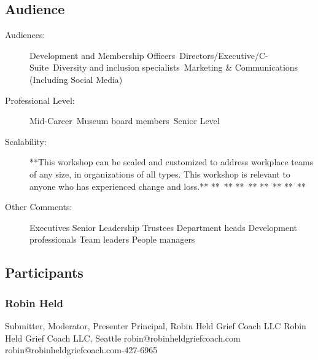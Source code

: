 \documentclass{report}
\begin{document}
              \subsection*{Audience}
                \begin{description}
                  \item [Audiences:]Development and Membership Officers~Directors/Executive/C-Suite~Diversity and inclusion specialists~Marketing \& Communications (Including Social Media)~
                  \item[Professional Level:]Mid-Career~Museum board members~Senior Level~
                \item[Scalability:] **This workshop can be scaled and customized to address workplace teams of any size, in organizations of all types. This workshop is relevant to anyone who has experienced change and loss.**
** **
** **
** **
** **
 

							
              \item[Other Comments:] Executives
Senior Leadership
Trustees
Department heads
Development professionals
Team leaders
People managers
              \end{description}
            \subsection*{Participants}
              \subsubsection*{ Robin Held }
              Submitter, Moderator, Presenter\newline
              Principal, Robin Held Grief Coach LLC\newline
              Robin Held Grief Coach LLC, Seattle
              \newline
              robin@robinheldgriefcoach.com\newline
              robin@robinheldgriefcoach.com-427-6965\newline
\end{document}
